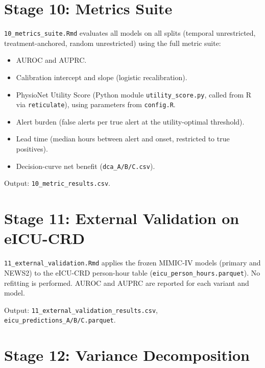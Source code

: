 \section{Stage 10: Metrics Suite}

\texttt{10\_metrics\_suite.Rmd} evaluates all models on all splits
(temporal unrestricted, treatment-anchored, random unrestricted) using the
full metric suite:

\begin{itemize}
  \item AUROC and AUPRC.
  \item Calibration intercept and slope (logistic recalibration).
  \item PhysioNet Utility Score (Python module \texttt{utility\_score.py},
  called from R via \texttt{reticulate}), using parameters from \texttt{config.R}.
  \item Alert burden (false alerts per true alert at the utility-optimal threshold).
  \item Lead time (median hours between alert and onset, restricted to true positives).
  \item Decision-curve net benefit (\texttt{dca\_A/B/C.csv}).
\end{itemize}

Output: \texttt{10\_metric\_results.csv}.

\section{Stage 11: External Validation on eICU-CRD}

\texttt{11\_external\_validation.Rmd} applies the frozen MIMIC-IV models (primary
and NEWS2) to the eICU-CRD person-hour table (\texttt{eicu\_person\_hours.parquet}).
No refitting is performed. AUROC and AUPRC are reported for each variant and model.

Output: \texttt{11\_external\_validation\_results.csv},
\texttt{eicu\_predictions\_A/B/C.parquet}.

\section{Stage 12: Variance Decomposition}

